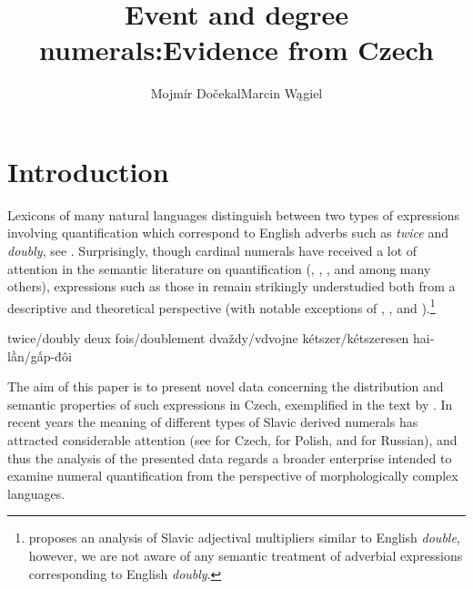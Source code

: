 \documentclass[output=paper,modfonts,hidelinks,newtxmath
\ChapterDOI{10.5281/zenodo.2545513}
]{langscibook}
\title{Event and degree numerals:\newlineCover Evidence from Czech}
\author{Mojmír Dočekal\affiliation{Masaryk University in Brno}\lastand Marcin Wągiel\affiliation{Masaryk University in Brno}}
\begin{document}
\maketitle
{}

\section{Introduction}\label{introduction}
\largerpage[-1.5]
Lexicons of many natural languages distinguish between two types of expressions involving quantification which correspond to English adverbs such as \textit{twice} and \textit{doubly}, see . Surprisingly, though cardinal numerals have received a lot of attention in the semantic literature on quantification (\citealt{landman2004indefinites}, \citealt{ionin_composition_2006}, \citealt{hofweber2005number}, and \citealt{rothstein2012numericals} among many others), expressions such as those in  remain strikingly understudied both from a descriptive and theoretical perspective (with notable exceptions of \citealt{landman_indefinite_2006}, \citealt{bhatt2007degree}, and \citealt{donazzan_ways_2013}).\footnote{\citet{wagiel-toappear-entities} proposes an analysis of Slavic adjectival multipliers similar to English \textit{double}, however, we are not aware of any semantic treatment of adverbial expressions corresponding to English \textit{doubly}.}

\ea \label{twice-double-expressions}
\settowidth{}
\ea twice/doubly             
\ex deux fois/doublement 
\ex dvaždy/vdvojne       
\ex kétszer/kétszeresen  
\ex hai-lần/gấp-đôi          
\z
\z

\noindent The aim of this paper is to present novel data concerning the distribution and semantic properties of such expressions in Czech, exemplified in the text by . In recent years the meaning of different types of Slavic derived numerals has attracted considerable attention (see \citealt{docekal2012atoms,docekal2013numerals} for Czech, \citealt{wagiel2014dwoje,wagiel2015sums} for Polish, and \citealt{khrizman2015cardinal} for Russian), and thus the analysis of the presented data regards a broader enterprise intended to examine numeral quantification from the perspective of morphologically complex languages.
\end{document}
